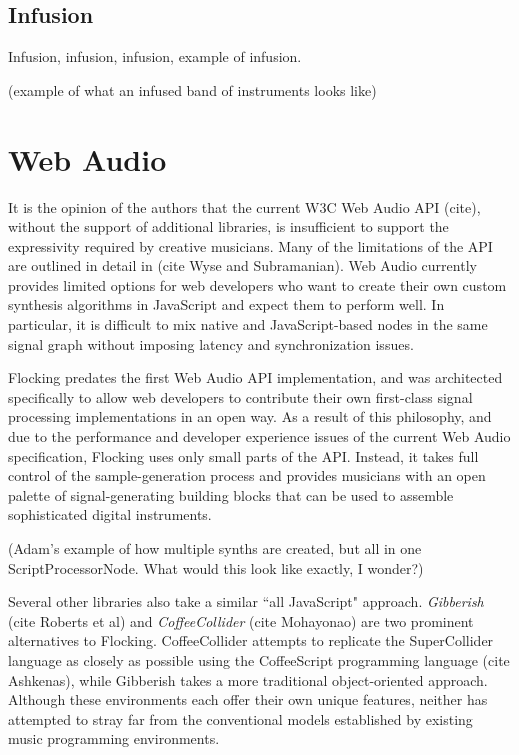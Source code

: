 \documentclass{article}
\begin{document}
\subsection{Infusion}
Infusion, infusion, infusion, example of infusion.

(example of what an infused band of instruments looks like)

\section{Web Audio}

It is the opinion of the authors that the current W3C Web Audio API (cite), without the support of additional libraries, is insufficient to support the expressivity required by creative musicians. Many of the limitations of the API are outlined in detail in (cite Wyse and Subramanian). Web Audio currently provides limited options for web developers who want to create their own custom synthesis algorithms in JavaScript and expect them to perform well. In particular, it is difficult to mix native and JavaScript-based nodes in the same signal graph without imposing latency and synchronization issues.

Flocking predates the first Web Audio API implementation, and was architected specifically to allow web developers to contribute their own first-class signal processing implementations in an open way. As a result of this philosophy, and due to the performance and developer experience issues of the current Web Audio specification, Flocking uses only small parts of the API. Instead, it takes full control of the sample-generation process and provides musicians with an open palette of signal-generating building blocks that can be used to assemble sophisticated digital instruments.

(Adam's example of how multiple synths are created, but all in one ScriptProcessorNode. What would this look like exactly, I wonder?)

Several other libraries also take a similar ``all JavaScript" approach. {\it Gibberish} (cite Roberts et al) and {\it CoffeeCollider} (cite Mohayonao) are two prominent alternatives to Flocking. CoffeeCollider attempts to replicate the SuperCollider language as closely as possible using the CoffeeScript programming language (cite Ashkenas), while Gibberish takes a more traditional object-oriented approach. Although these environments each offer their own unique features, neither has attempted to stray far from the conventional models established by existing music programming environments.
\end{document}
